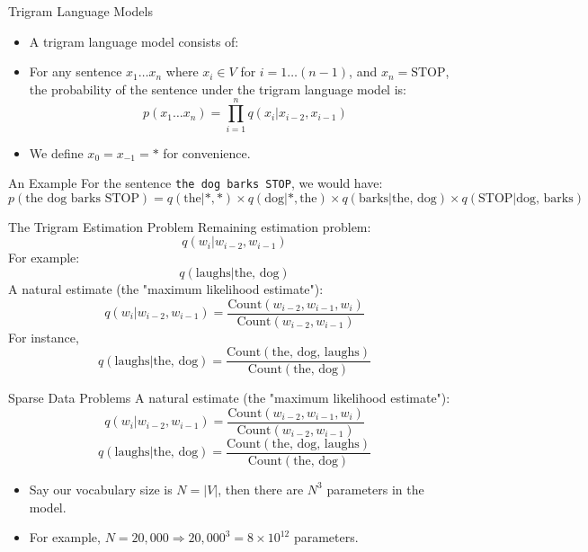 \documentclass[10pt]{beamer}
\begin{document}
\begin{frame}{Trigram Language Models}
    \scriptsize
    \begin{itemize}
        \item A trigram language model consists of:
        \item For any sentence $x_1 \ldots x_n$ where $x_i \in V$ for $i = 1 \ldots (n-1)$, and $x_n = \text{STOP}$, the probability of the sentence under the trigram language model is:
        \[
            p(x_1 \ldots x_n) = \prod_{i=1}^{n} q(x_i|x_{i-2}, x_{i-1})
        \]
        \item We define $x_0 = x_{-1} = *$ for convenience.
    \end{itemize}
\end{frame}

\begin{frame}{An Example}
    \scriptsize
    For the sentence \texttt{the dog barks STOP}, we would have:
    \[
        p(\text{the dog barks STOP}) = q(\text{the}|*, *) \times q(\text{dog}|*, \text{the}) \times q(\text{barks}|\text{the, dog}) \times q(\text{STOP}|\text{dog, barks})
    \]
\end{frame}

\begin{frame}{The Trigram Estimation Problem}
    \scriptsize
    Remaining estimation problem:
    \[
        q(w_i | w_{i-2}, w_{i-1})
    \]
    For example:
    \[
        q(\text{laughs} | \text{the, dog})
    \]
    A natural estimate (the "maximum likelihood estimate"):
    \[
        q(w_i | w_{i-2}, w_{i-1}) = \frac{{\text{Count}(w_{i-2}, w_{i-1}, w_i)}}{{\text{Count}(w_{i-2}, w_{i-1})}}
    \]
    For instance,
    \[
        q(\text{laughs} | \text{the, dog}) = \frac{{\text{Count}(\text{the, dog, laughs})}}{{\text{Count}(\text{the, dog})}}
    \]
\end{frame}

\begin{frame}{Sparse Data Problems}
    \scriptsize
    A natural estimate (the "maximum likelihood estimate"):
    \[
        q(w_i | w_{i-2}, w_{i-1}) = \frac{{\text{Count}(w_{i-2}, w_{i-1}, w_i)}}{{\text{Count}(w_{i-2}, w_{i-1})}}
    \]
    \[
        q(\text{laughs} | \text{the, dog}) = \frac{{\text{Count}(\text{the, dog, laughs})}}{{\text{Count}(\text{the, dog})}}
    \]
    \begin{itemize}
     \item     Say our vocabulary size is $N = |V|$, then there are $N^3$ parameters in the model.
     \item     For example, $N = 20,000 \Rightarrow 20,000^3 = 8 \times 10^{12}$ parameters.
    \end{itemize}


\end{frame}
\end{document}

